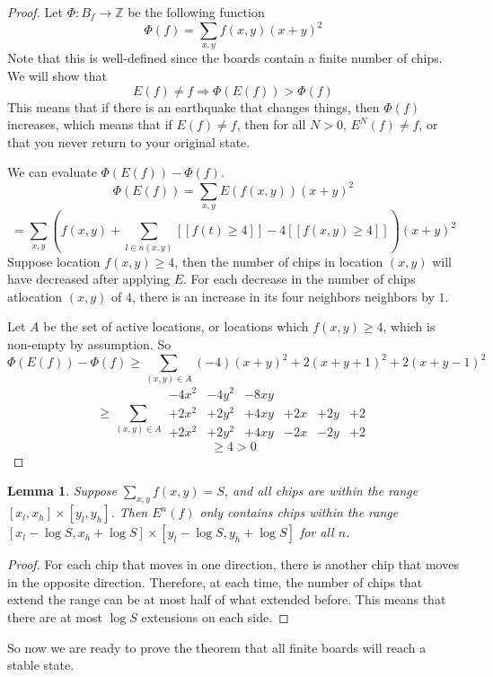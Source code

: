 \documentclass[11pt]{article}
\newtheorem{lemma}{Lemma}
\begin{document}
\begin{proof}
Let $\Phi: B_f \rightarrow \mathbb{Z}$ be the following function
\[ \Phi(f) = \sum_{x,y} f(x,y)(x+y)^2 \]
Note that this is well-defined since the boards contain a finite number of chips. We will show that 
\[ E(f) \neq f \Rightarrow \Phi(E(f)) > \Phi(f) \]
This means that if there is an earthquake that changes things, then $\Phi(f)$ increases, which means that if $E(f) \neq f$, then for all $N > 0$, $E^N(f) \neq f$, or that you never return to your original state.

We can evaluate $\Phi(E(f)) - \Phi(f)$.
\[ \Phi(E(f)) = \sum_{x,y} E(f(x,y)) (x+y)^2 \]
\[ = \sum_{x,y} \left(f(x,y) + \sum_{l \in n(x,y)} [[f(t) \geq 4]] - 4[[f(x,y) \geq 4]]\right) (x+y)^2 \]
Suppose location $f(x,y) \geq 4$, then the number of chips in location $(x,y)$ will have decreased after applying $E$. For each decrease in the number of chips atlocation $(x,y)$ of $4$, there is an increase in its four neighbors neighbors by $1$. 

Let $A$ be the set of active locations, or locations which $f(x,y) \geq 4$, which is non-empty by assumption. 
So
\[ \Phi(E(f)) - \Phi(f) \geq \sum_{(x,y) \in A} (-4)(x+y)^2 + 2(x+y+1)^2 + 2(x+y-1)^2 \]
\[ \geq \sum_{(x,y) \in A} \begin{array}{cccccc} -4x^2 & -4y^2 & -8xy & & &\\
									   +2x^2 & +2y^2 & +4xy & +2x& +2y &+ 2\\
									   +2x^2 & +2y^2 & +4xy & -2x& -2y  & +2 \end{array} \]
\[ \geq 4 > 0 \] 
\end{proof}

\begin{lemma}
\label{finiteextension}
Suppose $\sum_{x,y} f(x,y) = S$, and all chips are within the range $[x_l, x_h] \times [y_l, y_h]$. Then $E^n(f)$ only contains chips within the range $[x_l - \log S, x_h + \log S] \times [y_l-\log S, y_h+\log S]$ for all $n$.
\end{lemma}

\begin{proof}
For each chip that moves in one direction, there is another chip that moves in the opposite direction. Therefore, at each time, the number of chips that extend the range can be at most half of what extended before. This means that there are at most $\log S$ extensions on each side. 
\end{proof}

So now we are ready to prove the theorem that all finite boards will reach a stable state. 
\end{document}
